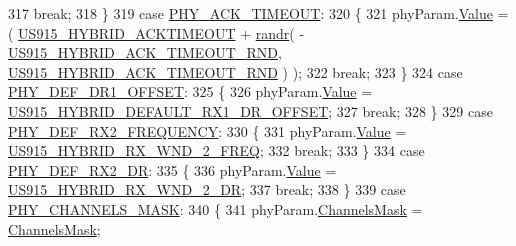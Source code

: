 \begin{DoxyCode}
317             \textcolor{keywordflow}{break};
318         \}
319         \textcolor{keywordflow}{case} \mbox{\hyperlink{group___r_e_g_i_o_n_gga51cbe8f5433d914fe9cf81b451de2c2da8485b24e94d037ba487ab6ecfaf162e8}{PHY\_ACK\_TIMEOUT}}:
320         \{
321             phyParam.\mbox{\hyperlink{unionu_phy_param_a8e0dcce3428a8051614e852b8836d0d1}{Value}} = ( \mbox{\hyperlink{group___r_e_g_i_o_n_u_s915_h_y_b_ga208cfcf431c114e3095c20552f5c0e77}{US915\_HYBRID\_ACKTIMEOUT}} + 
      \mbox{\hyperlink{utilities_8c_af5d8ad6dae489ac64821e7d4f004595d}{randr}}( -\mbox{\hyperlink{group___r_e_g_i_o_n_u_s915_h_y_b_ga559607e0b707cb0266b55efa2eb38a79}{US915\_HYBRID\_ACK\_TIMEOUT\_RND}}, 
      \mbox{\hyperlink{group___r_e_g_i_o_n_u_s915_h_y_b_ga559607e0b707cb0266b55efa2eb38a79}{US915\_HYBRID\_ACK\_TIMEOUT\_RND}} ) );
322             \textcolor{keywordflow}{break};
323         \}
324         \textcolor{keywordflow}{case} \mbox{\hyperlink{group___r_e_g_i_o_n_gga51cbe8f5433d914fe9cf81b451de2c2dae648c84cc946657e970c7e08dd69cb6f}{PHY\_DEF\_DR1\_OFFSET}}:
325         \{
326             phyParam.\mbox{\hyperlink{unionu_phy_param_a8e0dcce3428a8051614e852b8836d0d1}{Value}} = \mbox{\hyperlink{group___r_e_g_i_o_n_u_s915_h_y_b_ga314e35b76742b3b9ba602e5e2bbcba3f}{US915\_HYBRID\_DEFAULT\_RX1\_DR\_OFFSET}};
327             \textcolor{keywordflow}{break};
328         \}
329         \textcolor{keywordflow}{case} \mbox{\hyperlink{group___r_e_g_i_o_n_gga51cbe8f5433d914fe9cf81b451de2c2da1835125d2139942145a0ed0caff058f3}{PHY\_DEF\_RX2\_FREQUENCY}}:
330         \{
331             phyParam.\mbox{\hyperlink{unionu_phy_param_a8e0dcce3428a8051614e852b8836d0d1}{Value}} = \mbox{\hyperlink{group___r_e_g_i_o_n_u_s915_h_y_b_gae0b62d21f2751fe9c548352e251b41dc}{US915\_HYBRID\_RX\_WND\_2\_FREQ}};
332             \textcolor{keywordflow}{break};
333         \}
334         \textcolor{keywordflow}{case} \mbox{\hyperlink{group___r_e_g_i_o_n_gga51cbe8f5433d914fe9cf81b451de2c2da672678e5f03f8ad1afa8817405e72ef0}{PHY\_DEF\_RX2\_DR}}:
335         \{
336             phyParam.\mbox{\hyperlink{unionu_phy_param_a8e0dcce3428a8051614e852b8836d0d1}{Value}} = \mbox{\hyperlink{group___r_e_g_i_o_n_u_s915_h_y_b_ga6149ce49b92f289c275a6c6844c38d46}{US915\_HYBRID\_RX\_WND\_2\_DR}};
337             \textcolor{keywordflow}{break};
338         \}
339         \textcolor{keywordflow}{case} \mbox{\hyperlink{group___r_e_g_i_o_n_gga51cbe8f5433d914fe9cf81b451de2c2daa6fd00cadf73ba804e35d85aadd15882}{PHY\_CHANNELS\_MASK}}:
340         \{
341             phyParam.\mbox{\hyperlink{unionu_phy_param_aed7477cfc6166e3ee0499b898443426a}{ChannelsMask}} = \mbox{\hyperlink{_region_u_s915-_hybrid_8c_a2188957b5ca6af8092154d7ccbfa5757}{ChannelsMask}};

\end{DoxyCode}
